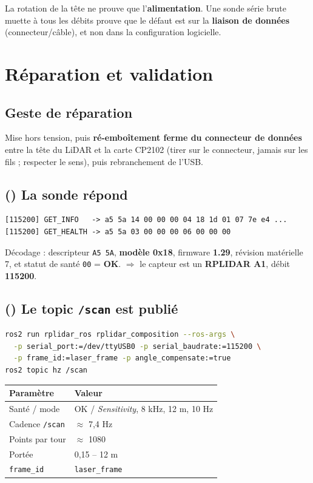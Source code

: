\documentclass[a4paper,11pt]{article}
\newcommand{\ok}{\textcolor{success}{\checkmark}}
\begin{document}
\begin{tcolorbox}[colback=lightgreen,colframe=success,title=Leçon clé]
La rotation de la tête ne prouve que l'\textbf{alimentation}. Une sonde série
brute muette à tous les débits prouve que le défaut est sur la \textbf{liaison de
données} (connecteur/câble), et non dans la configuration logicielle.
\end{tcolorbox}

\section{Réparation et validation}
\subsection{Geste de réparation}
Mise hors tension, puis \textbf{ré-emboîtement ferme du connecteur de données}
entre la tête du LiDAR et la carte CP2102 (tirer sur le connecteur, jamais sur
les fils ; respecter le sens), puis rebranchement de l'USB.

\subsection{(\ok) La sonde répond}
\begin{lstlisting}
[115200] GET_INFO   -> a5 5a 14 00 00 00 04 18 1d 01 07 7e e4 ...
[115200] GET_HEALTH -> a5 5a 03 00 00 00 06 00 00 00
\end{lstlisting}
Décodage : descripteur \texttt{A5 5A}, \textbf{modèle 0x18}, firmware
\textbf{1.29}, révision matérielle 7, et statut de santé \texttt{00} = \textbf{OK}.
$\Rightarrow$ le capteur est un \textbf{RPLIDAR A1}, débit \textbf{115200}.

\subsection{(\ok) Le topic \texttt{/scan} est publié}
\begin{lstlisting}[language=bash]
ros2 run rplidar_ros rplidar_composition --ros-args \
  -p serial_port:=/dev/ttyUSB0 -p serial_baudrate:=115200 \
  -p frame_id:=laser_frame -p angle_compensate:=true
ros2 topic hz /scan
\end{lstlisting}
\begin{center}
\begin{tabular}{@{}ll@{}}
\toprule
Paramètre & Valeur \\
\midrule
Santé / mode      & OK / \emph{Sensitivity}, 8 kHz, 12 m, 10 Hz \\
Cadence \texttt{/scan} & $\approx$ 7,4 Hz \\
Points par tour   & $\approx$ 1080 \\
Portée            & 0,15 -- 12 m \\
\texttt{frame\_id} & \texttt{laser\_frame} \\
\bottomrule
\end{tabular}
\end{center}
\end{document}
